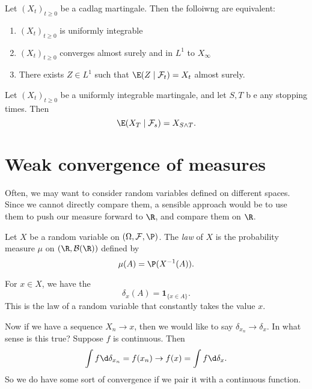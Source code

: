 \documentclass[a4paper]{article}
\begin{document}
\begin{thm}
  Let $(X_t)_{t \geq 0}$ be a cadlag martingale. Then the folloiwng are equivalent:
  \begin{enumerate}
    \item $(X_t)_{t \geq 0}$ is uniformly integrable
    \item $(X_t)_{t \geq 0}$ converges almost surely and in $L^1$ to $X_\infty$
    \item There exists $Z \in L^1$ such that $\E(Z \mid \mathcal{F}_t) = X_t$ almost surely.
  \end{enumerate}
\end{thm}

\begin{thm}
  Let $(X_t)_{t \geq 0}$ be a uniformly integrable martingale, and let $S, T$ b e any stopping times. Then
  \[
    \E (X_T \mid \mathcal{F}_s) = X_{S \wedge T}.
  \]
\end{thm}

\section{Weak convergence of measures}
Often, we may want to consider random variables defined on different spaces. Since we cannot directly compare them, a sensible approach would be to use them to push our measure forward to $\R$, and compare them on $\R$.

\begin{defi}[Law]
  Let $X$ be a random variable on $(\Omega, \mathcal{F}, \P)$. The \emph{law} of $X$ is the probability measure $\mu$ on $(\R, \mathcal{B}(\R))$ defined by
  \[
    \mu(A) = \P(X^{-1}(A)).
  \]
\end{defi}

\begin{eg}
  For $x \in X$, we have the 
  \[
    \delta_x(A) = \mathbf{1}_{\{x \in A\}}.
  \]
  This is the law of a random variable that constantly takes the value $x$.
\end{eg}
Now if we have a sequence $X_n \to x$, then we would like to say $\delta_{x_n} \to \delta_x$. In what sense is this true? Suppose $f$ is continuous. Then
\[
  \int f \d \delta_{x_n} = f(x_n) \to f(x) = \int f \d \delta_x.
\]
So we do have some sort of convergence if we pair it with a continuous function.
\end{document}
